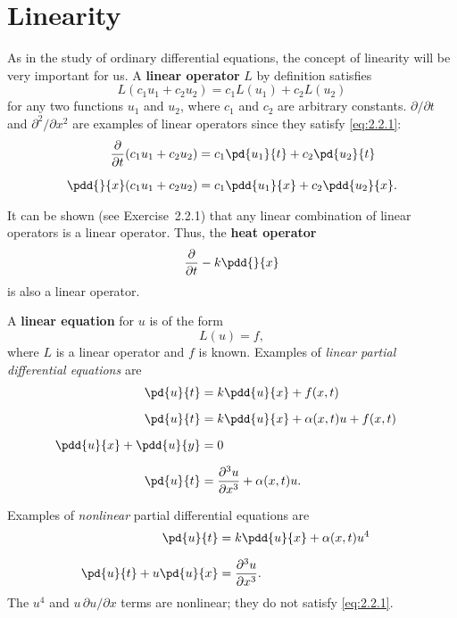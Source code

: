 \section{Linearity}
\label{sec:2.2}

As in the study of ordinary differential equations, the concept of linearity will be very important for us. A \textbf{linear operator} $L$ by definition satisfies
\begin{equation}
\label{eq:2.2.1}
\boxed{L(c_1 u_1 + c_2 u_2) = c_1 L(u_1) + c_2 L(u_2)}
\end{equation}
for any two functions $u_1$ and $u_2$, where $c_1$ and $c_2$ are arbitrary constants. $\partial/\partial t$ and $\partial^2/\partial x^2$ are examples of linear operators since they satisfy \eqref{eq:2.2.1}:
\begin{align*}
\frac{\partial}{\partial t}(c_1 u_1 + c_2 u_2) &= c_1 \pd{u_1}{t} + c_2 \pd{u_2}{t} \\[6pt]
\pdd{}{x}(c_1 u_1 + c_2 u_2) &= c_1 \pdd{u_1}{x} + c_2 \pdd{u_2}{x}.
\end{align*}

It can be shown (see Exercise~2.2.1) that any linear combination of linear operators is a linear operator. Thus, the \textbf{heat operator}
\[
\frac{\partial}{\partial t} - k\pdd{}{x}
\]
is also a linear operator.

A \textbf{linear equation} for $u$ is of the form
\begin{equation}
\label{eq:2.2.2}
L(u) = f,
\end{equation}
where $L$ is a linear operator and $f$ is known. Examples of \emph{linear partial differential equations} are
\begin{alignat}{2}
\pd{u}{t} &= k\pdd{u}{x} + f(x,t) & \label{eq:2.2.3} \\[6pt]
\pd{u}{t} &= k\pdd{u}{x} + \alpha(x,t)u + f(x,t) & \label{eq:2.2.4} \\[6pt]
\pdd{u}{x} + \pdd{u}{y} &= 0 & \label{eq:2.2.5} \\[6pt]
\pd{u}{t} &= \frac{\partial^3 u}{\partial x^3} + \alpha(x,t)u. & \label{eq:2.2.6}
\end{alignat}

Examples of \emph{nonlinear} partial differential equations are
\begin{alignat}{2}
\pd{u}{t} &= k\pdd{u}{x} + \alpha(x,t)u^4 & \label{eq:2.2.7} \\[6pt]
\pd{u}{t} + u\pd{u}{x} &= \frac{\partial^3 u}{\partial x^3}. & \label{eq:2.2.8}
\end{alignat}
The $u^4$ and $u\,\partial u/\partial x$ terms are nonlinear; they do not satisfy \eqref{eq:2.2.1}.

